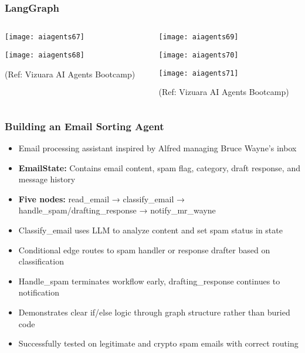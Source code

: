 \begin{frame}[fragile]\frametitle{LangGraph}
\begin{columns}
    \begin{column}[T]{0.5\linewidth}
        \begin{center}
		
        \texttt{[image: aiagents67]}
		
        \texttt{[image: aiagents68]}
		
		
		{\tiny (Ref: Vizuara AI Agents Bootcamp)}
				
        \end{center}    
    \end{column}
    \begin{column}[T]{0.5\linewidth}
        \begin{center}
        \texttt{[image: aiagents69]}
		
        \texttt{[image: aiagents70]}
		
        \texttt{[image: aiagents71]}
		
		{\tiny (Ref: Vizuara AI Agents Bootcamp)}
				
        \end{center}    
    \end{column}
  \end{columns}
\end{frame}

\begin{frame}[fragile]\frametitle{Building an Email Sorting Agent}

      \begin{itemize}
        \item Email processing assistant inspired by Alfred managing Bruce Wayne's inbox
        \item \textbf{EmailState:} Contains email content, spam flag, category, draft response, and message history
        \item \textbf{Five nodes:} read\_email → classify\_email → handle\_spam/drafting\_response → notify\_mr\_wayne
        \item Classify\_email uses LLM to analyze content and set spam status in state
        \item Conditional edge routes to spam handler or response drafter based on classification
        \item Handle\_spam terminates workflow early, drafting\_response continues to notification
        \item Demonstrates clear if/else logic through graph structure rather than buried code
        \item Successfully tested on legitimate and crypto spam emails with correct routing
      \end{itemize}

\end{frame}

